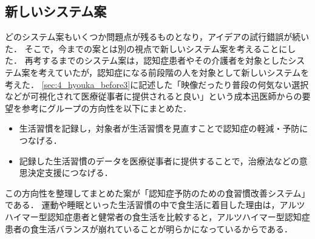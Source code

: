 \documentclass[../report]{subfiles}
\begin{document}
\subsection{新しいシステム案}
どのシステム案もいくつか問題点が残るものとなり，アイデアの試行錯誤が続いた．
そこで，今までの案とは別の視点で新しいシステム案を考えることにした．
再考するまでのシステム案は，認知症患者やその介護者を対象としたシステム案を考えていたが，認知症になる前段階の人を対象として新しいシステムを考えた．
\ref{sec:4_hyouka_before3}に記述した「映像だったり普段の何気ない選択などが可視化されて医療従事者に提供されると良い」という成本迅医師からの要望を参考にグループの方向性を以下にまとめた．

\begin{itemize}
    \item 生活習慣を記録し，対象者が生活習慣を見直すことで認知症の軽減・予防につなげる．
    \item 記録した生活習慣のデータを医療従事者に提供することで，治療法などの意思決定支援につなげる．
\end{itemize}

この方向性を整理してまとめた案が「認知症予防のための食習慣改善システム」である．
運動や睡眠といった生活習慣の中で食生活に着目した理由は，アルツハイマー型認知症患者と健常者の食生活を比較すると，アルツハイマー型認知症患者の食生活バランスが崩れている\cite{dementia-nutrition}ことが明らかになっているからである．
\end{document}
